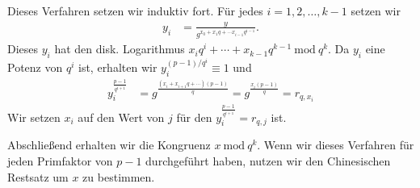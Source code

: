 \documentclass[
  a4paper,
  11pt,
]{scrartcl}
\theoremstyle{plain}
\theoremstyle{definition}
\theoremstyle{remark}
\newcommand{\Mod}[1]{\ \mathrm{mod}\ #1}
\begin{document}
Dieses Verfahren setzen wir induktiv fort. Für jedes $i = 1, 2, \ldots, k-1$
setzen wir
\begin{align*}
  y_i & = \frac{y}{g^{x_0 + x_1 q + \cdots x_{i-1} q^{i-1}}}.
\end{align*}
Dieses $y_i$ hat den disk. Logarithmus
$x_i q^i + \cdots + x_{k-1} q^{k-1} \Mod{q^k}$. Da $y_i$ eine Potenz von $q^i$
ist, erhalten wir $y_i^{(p-1)/q^i} \equiv 1$ und
\begin{align*}
  y_i^{\frac{p-1}{q^{i+1}}} &
    = g^{\frac{(x_i + x_{i+1} q + \cdots) (p-1)}{q}}
    = g^{\frac{x_i (p-1)}{q}}
    = r_{q, x_i}
\end{align*}
Wir setzen $x_i$ auf den Wert von $j$ für den
$y_i^{\frac{p-1}{q^{i+1}}} = r_{q, j}$ ist.

Abschließend erhalten wir die Kongruenz $x \Mod{q^k}$. Wenn wir dieses Verfahren
für jeden Primfaktor von $p-1$ durchgeführt haben, nutzen wir den Chinesischen
Restsatz um $x$ zu bestimmen.
\end{document}
